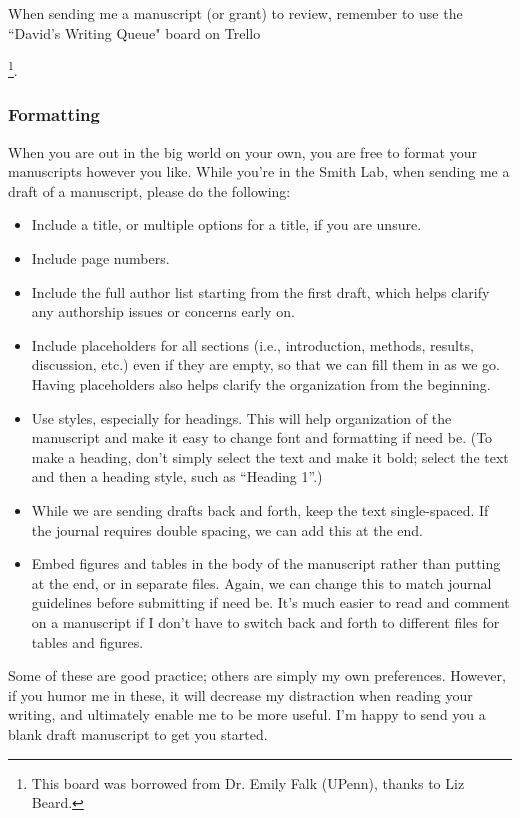 \documentclass[letterpaper,12pt,oneside]{memoir}
\begin{document}
When sending me a manuscript (or grant) to review, remember to use the ``David's Writing Queue" board on Trello{\footnote{This board was borrowed from Dr. Emily Falk (UPenn), thanks to Liz Beard.}.

\subsubsection{Formatting}

When you are out in the big world on your own, you are free to format your manuscripts however you like. While you're in the Smith Lab, when sending me a draft of a manuscript, please do the following:

\begin{itemize}
\item Include a title, or multiple options for a title, if you are unsure. 
\item Include page numbers.
\item Include the full author list starting from the first draft, which helps clarify any authorship issues or concerns early on.
\item Include placeholders for all sections (i.e., introduction, methods, results, discussion, etc.) even if they are empty, so that we can fill them in as we go. Having placeholders also helps clarify the organization from the beginning.
\item Use styles, especially for headings. This will help organization of the manuscript and make it easy to change font and formatting if need be. (To make a heading, don't simply select the text and make it bold; select the text and then a heading style, such as ``Heading 1''.)
\item While we are sending drafts back and forth, keep the text single-spaced. If the journal requires double spacing, we can add this at the end.
\item Embed figures and tables in the body of the manuscript rather than putting at the end, or in separate files. Again, we can change this to match journal guidelines before submitting if need be. It's much easier to read and comment on a manuscript if I don't have to switch back and forth to different files for tables and figures.
\end{itemize}

Some of these are good practice; others are simply my own preferences. However, if you humor me in these, it will decrease my distraction when reading your writing, and ultimately enable me to be more useful. I'm happy to send you a blank draft manuscript to get you started.

}
\end{document}
